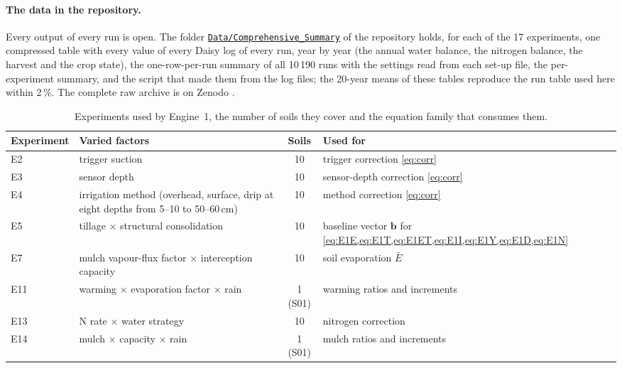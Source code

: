 \documentclass[preprint,12pt]{elsarticle}
\newcommand{\csurl}{https://github.com/halilunaziru73-creator/Coupled-Water-Fluxes-Pore-Scale-Dynamics-Precision-Irrigation-Mulching-Feedback-Loops/tree/main/Data/Comprehensive_Summary}
\newcommand{\cslink}{\href{\csurl}{\nolinkurl{Data/Comprehensive_Summary}}}
\begin{document}
\paragraph{The data in the repository.} Every output of every run is open. The folder \cslink{} of the repository holds, for each of the 17 experiments, one compressed table with every value of every Daisy log of every run, year by year (the annual water balance, the nitrogen balance, the harvest and the crop state), the one-row-per-run summary of all 10\,190 runs with the settings read from each set-up file, the per-experiment summary, and the script that made them from the log files; the 20-year means of these tables reproduce the run table used here within 2\,\%. The complete raw archive is on Zenodo \cite{HaliluData}.




\begin{table}[H]\centering\small
\caption{Experiments used by Engine~1, the number of soils they cover and the equation family that consumes them.}
\label{tab:expuse}
\begin{tabular}{lp{4.9cm}cp{5.2cm}}
\toprule
Experiment & Varied factors & Soils & Used for\\\midrule
E2 & trigger suction & 10 & trigger correction \cref{eq:corr}\\
E3 & sensor depth & 10 & sensor-depth correction \cref{eq:corr}\\
E4 & irrigation method (overhead, surface, drip at eight depths from 5--10 to 50--60\,cm) & 10 & method correction \cref{eq:corr}\\
E5 & tillage $\times$ structural consolidation & 10 & baseline vector $\mathbf b$ for \cref{eq:E1E,eq:E1T,eq:E1ET,eq:E1I,eq:E1Y,eq:E1D,eq:E1N}\\
E7 & mulch vapour-flux factor $\times$ interception capacity & 10 & soil evaporation $\bar E$\\
E11 & warming $\times$ evaporation factor $\times$ rain & 1 (S01) & warming ratios and increments\\
E13 & N rate $\times$ water strategy & 10 & nitrogen correction\\
E14 & mulch $\times$ capacity $\times$ rain & 1 (S01) & mulch ratios and increments\\\bottomrule
\end{tabular}
\end{table}
\end{document}
